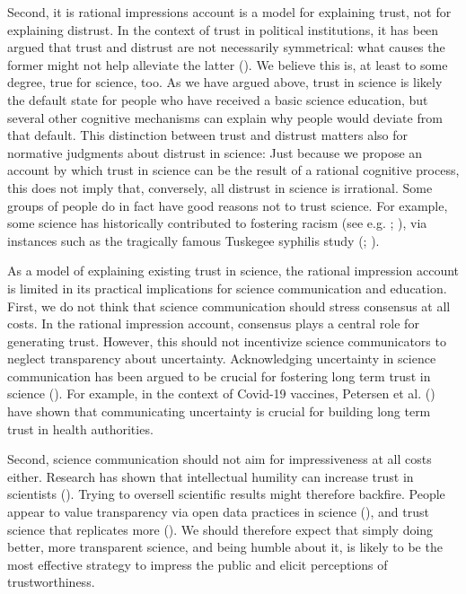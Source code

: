 \documentclass[
  jou,
  floatsintext,
  longtable,
  nolmodern,
  notxfonts,
  notimes,
  colorlinks=true,linkcolor=blue,citecolor=blue,urlcolor=blue]{apa7}
\begin{document}
Second, it is rational impressions account is a model for explaining
trust, not for explaining distrust. In the context of trust in political
institutions, it has been argued that trust and distrust are not
necessarily symmetrical: what causes the former might not help alleviate
the latter
().
We believe this is, at least to some degree, true for science, too. As
we have argued above, trust in science is likely the default state for
people who have received a basic science education, but several other
cognitive mechanisms can explain why people would deviate from that
default. This distinction between trust and distrust matters also for
normative judgments about distrust in science: Just because we propose
an account by which trust in science can be the result of a rational
cognitive process, this does not imply that, conversely, all distrust in
science is irrational. Some groups of people do in fact have good
reasons not to trust science. For example, some science has historically
contributed to fostering racism (see e.g.
;
), via
instances such as the tragically famous Tuskegee syphilis study
(;
).

As a model of explaining existing trust in science, the rational
impression account is limited in its practical implications for science
communication and education. First, we do not think that science
communication should stress consensus at all costs. In the rational
impression account, consensus plays a central role for generating trust.
However, this should not incentivize science communicators to neglect
transparency about uncertainty. Acknowledging uncertainty in science
communication has been argued to be crucial for fostering long term
trust in science
(). For example, in the context of Covid-19 vaccines, Petersen et
al. ()
have shown that communicating uncertainty is crucial for building long
term trust in health authorities.

Second, science communication should not aim for impressiveness at all
costs either. Research has shown that intellectual humility can increase
trust in scientists
().
Trying to oversell scientific results might therefore backfire. People
appear to value transparency via open data practices in science
(), and
trust science that replicates more
(). We should therefore expect that simply doing better, more
transparent science, and being humble about it, is likely to be the most
effective strategy to impress the public and elicit perceptions of
trustworthiness.
\end{document}
